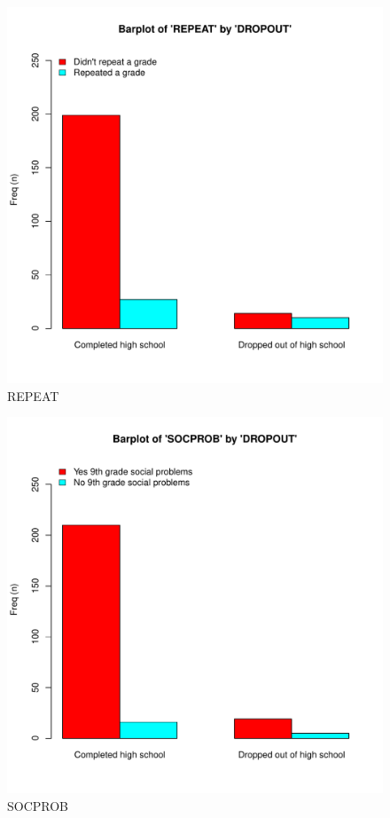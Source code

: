 \documentclass[a4paper,titlepage,12pt]{article}
\begin{document}
    \begin{figure}[H]
    \begin{center}
    \caption{REPEAT}
    \includegraphics[width=17cm]{./allgroups_report_figures/bivar_REPEAT.pdf}
    \end{center}
    \end{figure}
    
    \begin{figure}[H]
    \begin{center}
    \caption{SOCPROB}
    \includegraphics[width=17cm]{./allgroups_report_figures/bivar_SOCPROB.pdf}
    \end{center}
    \end{figure}
    
  
\end{document}
